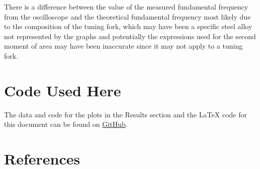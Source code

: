 \documentclass{article}
\begin{document}
There is a difference between the value of the measured fundamental frequency from the oscilloscope and the theoretical fundamental frequency most likely due to the composition of the tuning fork, which may have been a specific steel alloy not represented by the graphs and potentially the expressions used for the second moment of area may have been inaccurate since it may not apply to a tuning fork.


\section{Code Used Here}
The data and code for the plots in the Results section and the LaTeX code for this document can be found on \href{https://github.com/marloonles/advancedlab2}{GitHub}.

\section{References}


\end{document}
